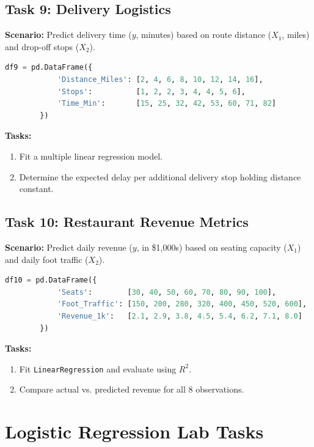 \documentclass[11pt,a4paper]{article}
\begin{document}
	\subsection{Task 9: Delivery Logistics}
	\textbf{Scenario:} Predict delivery time ($y$, minutes) based on route distance ($X_1$, miles) and drop-off stops ($X_2$).
	\begin{lstlisting}[language=Python]
		df9 = pd.DataFrame({
			'Distance_Miles': [2, 4, 6, 8, 10, 12, 14, 16],
			'Stops':          [1, 2, 2, 3, 4, 4, 5, 6],
			'Time_Min':       [15, 25, 32, 42, 53, 60, 71, 82]
		})
	\end{lstlisting}
	\textbf{Tasks:}
	\begin{enumerate}
		\item Fit a multiple linear regression model.
		\item Determine the expected delay per additional delivery stop holding distance constant.
	\end{enumerate}
	
	\subsection{Task 10: Restaurant Revenue Metrics}
	\textbf{Scenario:} Predict daily revenue ($y$, in \$1,000s) based on seating capacity ($X_1$) and daily foot traffic ($X_2$).
	\begin{lstlisting}[language=Python]
		df10 = pd.DataFrame({
			'Seats':        [30, 40, 50, 60, 70, 80, 90, 100],
			'Foot_Traffic': [150, 200, 280, 320, 400, 450, 520, 600],
			'Revenue_1k':   [2.1, 2.9, 3.8, 4.5, 5.4, 6.2, 7.1, 8.0]
		})
	\end{lstlisting}
	\textbf{Tasks:}
	\begin{enumerate}
		\item Fit \texttt{LinearRegression} and evaluate using $R^2$.
		\item Compare actual vs. predicted revenue for all 8 observations.
	\end{enumerate}
	
	\pagebreak
	
	\section{Logistic Regression Lab Tasks}
	
\end{document}
